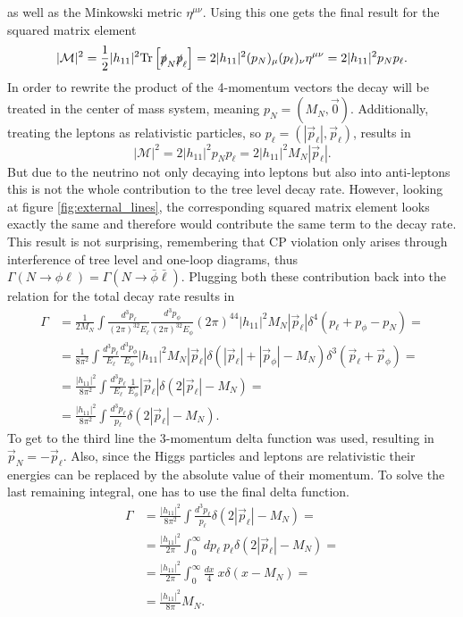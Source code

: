 as well as the Minkowski metric $\eta^{\mu\nu}$. Using this one gets the final result for the squared matrix element
\begin{equation*}
	|\mathcal{M}|^2=\frac{1}{2}|h_{11}|^2\text{Tr}\left[\slashed p_N \slashed p_\ell\right]=2|h_{11}|^2(p_N)_\mu (p_\ell)_\nu\eta^{\mu\nu}=2|h_{11}|^2p_Np_\ell.
\end{equation*}
In order to rewrite the product of the 4-momentum vectors the decay will be treated in the center of mass system, meaning $p_N=(M_N,\vec{0})$. Additionally, treating the leptons as relativistic particles, so $p_\ell=(|\vec{p}_\ell|,\vec{p}_\ell)$, results in
\begin{equation*}
|\mathcal{M}|^2=2|h_{11}|^2p_Np_\ell=2|h_{11}|^2M_N|\vec{p}_\ell|.
\end{equation*}
But due to the neutrino not only decaying into leptons but also into anti-leptons this is not the whole contribution to the tree level decay rate. However, looking at figure \ref{fig:external_lines}, the corresponding squared matrix element looks exactly the same and therefore would contribute the same term to the decay rate. This result is not surprising, remembering that CP violation only arises through interference of tree level and one-loop diagrams, thus $\Gamma(N\rightarrow\phi\ell)=\Gamma(N\rightarrow\bar{\phi}\bar{\ell})$. Plugging both these contribution back into the relation for the total decay rate results in 
\begin{align*}
	\Gamma&=\frac{1}{2M_N}\int\frac{d^3p_\ell}{(2\pi)^32E_\ell}\frac{d^3p_\phi}{(2\pi)^32E_\phi}(2\pi)^44|h_{11}|^2M_N|\vec{p}_\ell|\delta^4\left(p_\ell+p_\phi-p_N\right)=\\
	&=\frac{1}{8\pi^2}\int\frac{d^3p_\ell}{E_\ell}\frac{d^3p_\phi}{E_\phi}|h_{11}|^2M_N|\vec{p}_\ell|\delta\left(|\vec{p}_\ell|+|\vec{p}_\phi|-M_N\right)\delta^3\left(\vec{p}_\ell+\vec{p}_\phi\right)=\\
	&=\frac{|h_{11}|^2}{8\pi^2}\int\frac{d^3p_\ell}{E_\ell}\frac{1}{E_\phi}|\vec{p}_\ell|\delta\left(2|\vec{p}_\ell|-M_N\right)=\\
	&=\frac{|h_{11}|^2}{8\pi^2}\int\frac{d^3p_\ell}{p_\ell}\delta\left(2|\vec{p}_\ell|-M_N\right).
\end{align*}
To get to the third line the 3-momentum delta function was used, resulting in $\vec{p}_N=-\vec{p}_\ell$. Also, since the Higgs particles and leptons are relativistic their energies can be replaced by the absolute value of their momentum. To solve the last remaining integral, one has to use the final delta function.
\begin{align*}
	\Gamma&=\frac{|h_{11}|^2}{8\pi^2}\int\frac{d^3p_\ell}{p_\ell}\delta\left(2|\vec{p}_\ell|-M_N\right)=\\
	&=\frac{|h_{11}|^2}{2\pi}\int_0^{\infty} dp_\ell \:p_\ell\delta\left(2|\vec{p}_\ell|-M_N\right)=\\
	&=\frac{|h_{11}|^2}{2\pi}\int_0^{\infty} \frac{dx}{4}\:x\delta\left(x-M_N\right)=\\
	&=\frac{|h_{11}|^2}{8\pi}M_N.
\end{align*}
